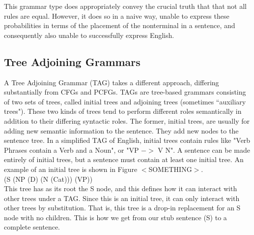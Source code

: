 This grammar type does appropriately convey the crucial truth that that not all rules are equal.
However, it does so in a naive way, unable to express these probabilities in terms of the placement
of the nonterminal in a sentence, and consequently also unable to successfully express English.

\subsection{Tree Adjoining Grammars}

A Tree Adjoining Grammar (TAG) takes a different approach, differing substantially from CFGs and PCFGs.
TAGs are tree-based grammars consisting of two sets of trees, called initial
trees and adjoining trees (sometimes ``auxiliary trees").  These two kinds of trees tend to perform
different roles semantically in addition to their differing syntactic roles.  The former,
initial trees, are usually for adding new semantic information to the sentence.  They
add new nodes to the sentence tree.  In a simplified TAG of English,
initial trees contain rules like "Verb Phrases contain a Verb and a Noun", or "VP $->$ V N".
A sentence can be made entirely of initial trees, but a sentence must contain at least
one initial tree.  An example of an initial tree is shown in Figure $<$SOMETHING$>$.\\
(S (NP (D) (N (Cat))) (VP))\\
This tree has as its root the S node, and this defines how it can interact with other
trees under a TAG.  Since this is an initial tree, it can only interact with other trees by
substitution.  That is, this tree is a drop-in replacement for an S node with no children.
This is how we get from our stub sentence (S) to a complete sentence.

